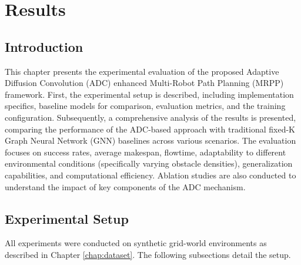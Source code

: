 \chapter{Results}
\label{chap:results}

\section{Introduction}
This chapter presents the experimental evaluation of the proposed Adaptive Diffusion Convolution (ADC) enhanced Multi-Robot Path Planning (MRPP) framework. First, the experimental setup is described, including implementation specifics, baseline models for comparison, evaluation metrics, and the training configuration. Subsequently, a comprehensive analysis of the results is presented, comparing the performance of the ADC-based approach with traditional fixed-K Graph Neural Network (GNN) baselines across various scenarios. The evaluation focuses on success rates, average makespan, flowtime, adaptability to different environmental conditions (specifically varying obstacle densities), generalization capabilities, and computational efficiency. Ablation studies are also conducted to understand the impact of key components of the ADC mechanism.

\section{Experimental Setup}
\label{sec:exp_setup}

All experiments were conducted on synthetic grid-world environments as described in Chapter \ref{chap:dataset}. The following subsections detail the setup.

